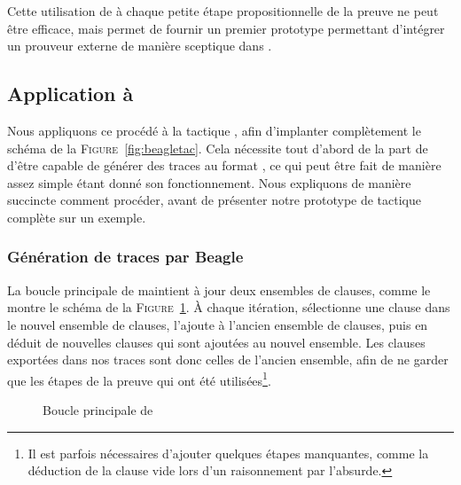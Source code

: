 Cette utilisation de \metistac à chaque petite étape propositionnelle de
la preuve ne peut être efficace, mais permet de fournir un premier
prototype permettant d'intégrer un prouveur externe de manière sceptique
dans \holfour.


\subsection{Application à \beagle}

Nous appliquons ce procédé à la tactique \beagletac, afin d'implanter
complètement le schéma de la \textsc{Figure}~\ref{fig:beagletac}. Cela
nécessite tout d'abord de la part de \beagle d'être capable de générer
des traces au format \tff, ce qui peut être fait de manière assez simple
étant donné son fonctionnement. Nous expliquons de manière succincte
comment procéder, avant de présenter notre prototype de tactique
\beagletac complète sur un exemple.


\subsubsection{Génération de traces par Beagle}
La boucle principale de \beagle maintient à jour deux ensembles de
clauses, comme le montre le schéma de la
\textsc{Figure}~\ref{fig:fonctionnement_beagle}. À chaque itération,
\beagle sélectionne une clause dans le nouvel ensemble de clauses,
l'ajoute à l'ancien ensemble de clauses, puis en déduit de nouvelles
clauses qui sont ajoutées au nouvel ensemble. Les clauses exportées dans
nos traces sont donc celles de l'ancien ensemble, afin de ne garder que
les étapes de la preuve qui ont été utilisées\footnote{Il est parfois
  nécessaires d'ajouter quelques étapes manquantes, comme la déduction
  de la clause vide lors d'un raisonnement par l'absurde.}.

\begin{figure}[!h]
\begin{center}
\caption{Boucle principale de \beagle}
\label{fig:fonctionnement_beagle}
\end{center}
\end{figure}

